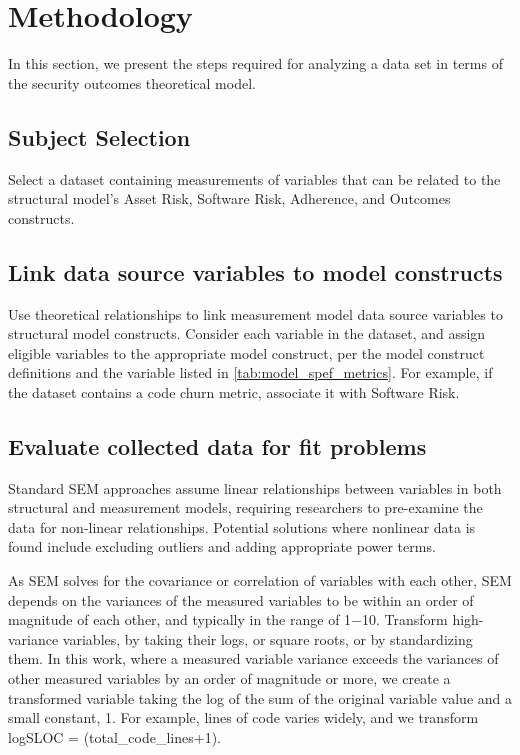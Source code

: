 \section{Methodology}
\label{sec:methodology}
In this section, we present the steps required for analyzing a data set in terms of the security outcomes theoretical model.

\subsection{Subject Selection}
Select a dataset containing measurements of variables that can be related to the structural model's Asset Risk, Software Risk, Adherence, and Outcomes constructs.  

\subsection{Link data source variables to model constructs}
Use theoretical relationships to link measurement model data source variables to structural model constructs. Consider each variable in the dataset, and assign eligible variables to the appropriate model construct, per the model construct definitions and the variable listed in \ref{tab:model_spef_metrics}. For example, if the dataset contains a code churn metric, associate it with Software Risk. 

\subsection{Evaluate collected data for fit problems}
Standard SEM approaches assume linear relationships between variables in both structural and measurement models, requiring researchers to pre-examine the data for non-linear relationships. Potential solutions where nonlinear data is found include excluding outliers and adding appropriate power terms.

As SEM solves for the covariance or correlation of variables with each other, SEM depends on the variances of the measured variables to be within an order of magnitude of each other, and typically in the range of 1$-$10. Transform high-variance variables, by taking their logs, or square roots, or by standardizing them. In this work, where a measured variable variance exceeds the variances of other measured variables by an order of magnitude or more, we create a transformed variable taking the log of the sum of the original variable value and a small constant, 1. For example, lines of code varies widely, and  we transform logSLOC = (total\_code\_lines+1).

